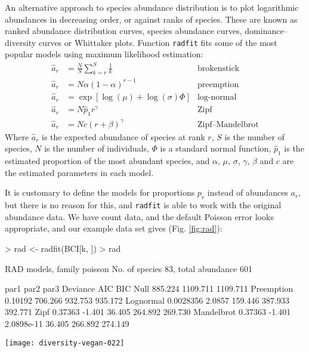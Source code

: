\documentclass[a4paper,10pt]{amsart}
\begin{document}
An alternative approach to species abundance distribution is to plot
logarithmic abundances in decreasing order, or against ranks of
species.  These are known as ranked abundance
distribution curves, species abundance curves, dominance--diversity
curves or Whittaker plots.
Function \texttt{radfit} fits some of the most popular models using
maximum likelihood estimation:
\begin{align}
\hat a_r &= \frac{N}{S} \sum_{k=r}^S \frac{1}{k} &\text{brokenstick}\\
\hat a_r &= N \alpha (1-\alpha)^{r-1} & \text{preemption} \\
\hat a_r &= \exp \left[\log (\mu) + \log (\sigma) \Phi \right]
&\text{log-normal}\\
\hat a_r &= N \hat p_1 r^\gamma &\text{Zipf}\\
\hat a_r &= N c (r + \beta)^\gamma &\text{Zipf--Mandelbrot}
\end{align}
Where $\hat a_r$ is the expected abundance of species at rank $r$, $S$
is the number of species, $N$ is the number of individuals, $\Phi$ is
a standard normal function, $\hat p_1$ is the estimated proportion of
the most abundant species, and $\alpha$, $\mu$, $\sigma$, $\gamma$,
$\beta$ and $c$ are the estimated parameters in each model.

It is customary to define the models for proportions $p_r$ instead of
abundances $a_r$, but there is no reason for this, and \texttt{radfit}
is able to work with the original abundance data.  We have count data,
and the default Poisson error looks appropriate, and our example data
set gives (Fig. \ref{fig:rad}):
\begin{Schunk}
\begin{Sinput}
> rad <- radfit(BCI[k, ])
> rad
\end{Sinput}
\begin{Soutput}
RAD models, family poisson 
No. of species 83, total abundance 601

           par1       par2    par3        Deviance AIC      BIC     
Null                                       885.224 1109.711 1109.711
Preemption  0.10192                        706.266  932.753  935.172
Lognormal   0.0028356  2.0857              159.446  387.933  392.771
Zipf        0.37363   -1.401                36.405  264.892  269.730
Mandelbrot  0.37363   -1.401   2.0898e-11   36.405  266.892  274.149
\end{Soutput}
\end{Schunk}
\begin{SCfigure}
\texttt{[image: diversity-vegan-022]}
\caption{Ranked abundance distribution models for a random plot
  (no. 35).  The best model has the lowest \textsc{aic}.}
\label{fig:rad}
\end{SCfigure}
\end{document}
